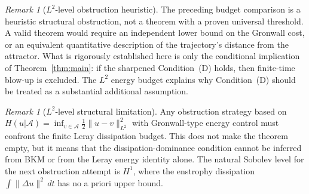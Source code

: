 \documentclass[12pt,a4paper]{article}
\theoremstyle{definition}
\theoremstyle{plain}
\theoremstyle{remark}
\newtheorem{remark}[definition]{Remark}
\begin{document}
\begin{remark}[$L^2$-level obstruction heuristic]\label{thm:L2-obstruction}
The preceding budget comparison is a heuristic structural obstruction,
not a theorem with a proven universal threshold.  A valid theorem would
require an independent lower bound on the Gronwall cost, or an equivalent
quantitative description of the trajectory's distance from the attractor.
What is rigorously established here is only the conditional implication
of Theorem~\ref{thm:main}: if the sharpened Condition~(D) holds, then
finite-time blow-up is excluded.  The $L^2$ energy budget explains why
Condition~(D) should be treated as a substantial additional assumption.
\end{remark}

\begin{remark}[$L^2$-level structural limitation]\label{cor:L2-limitation}
Any obstruction strategy based on
$H(u|\mathcal{A}) = \inf_{v \in \mathcal{A}}\frac{1}{2}\|u-v\|_{L^2}^2$
with Gronwall-type energy control must confront the finite Leray
dissipation budget.  This does not make the theorem empty, but it means
that the dissipation-dominance condition cannot be inferred from BKM or
from the Leray energy identity alone.  The natural Sobolev level for the
next obstruction attempt is $H^1$, where the enstrophy dissipation
$\int\|\Delta u\|^2\,dt$ has no a priori upper bound.
\end{remark}
\end{document}
